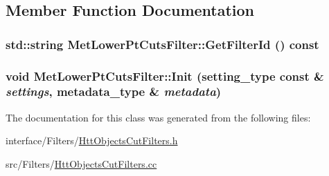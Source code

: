 \subsection{Member Function Documentation}
\hypertarget{classMetLowerPtCutsFilter_aa0a2851e6e009456638d61df400d6ab7}{
\subsubsection[{GetFilterId}]{\setlength{\rightskip}{0pt plus 5cm}std::string MetLowerPtCutsFilter::GetFilterId () const}}
\label{classMetLowerPtCutsFilter_aa0a2851e6e009456638d61df400d6ab7}
\hypertarget{classMetLowerPtCutsFilter_a2788270dc0767971a9bf381fa98d031d}{
\subsubsection[{Init}]{\setlength{\rightskip}{0pt plus 5cm}void MetLowerPtCutsFilter::Init (setting\_\-type const \& {\em settings}, \/  metadata\_\-type \& {\em metadata})}}
\label{classMetLowerPtCutsFilter_a2788270dc0767971a9bf381fa98d031d}


The documentation for this class was generated from the following files:\begin{DoxyCompactItemize}
\item 
interface/Filters/\hyperlink{HttObjectsCutFilters_8h}{HttObjectsCutFilters.h}\item 
src/Filters/\hyperlink{HttObjectsCutFilters_8cc}{HttObjectsCutFilters.cc}\end{DoxyCompactItemize}
